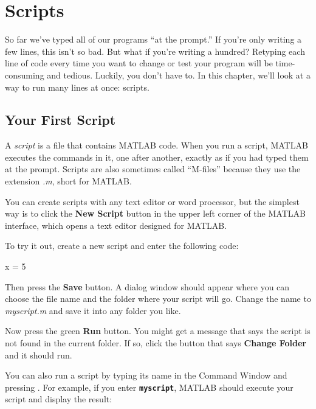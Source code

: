 \chapter{Scripts}

So far we've typed all of our programs ``at the prompt.'' If you're only writing a few lines, this isn't so bad. But what if you're writing a hundred? Retyping each line of code every time you want to change or test your program will be time-consuming and tedious. Luckily, you don't have to. In this chapter, we'll look at a way to run many lines at once: scripts.


\section{Your First Script}

A \emph{script} is a file that contains MATLAB code. When you run a script, MATLAB executes the commands in it, one after another, exactly as if you had typed them at the prompt. Scripts are
also sometimes called ``M-files'' because they use the extension {\em .m}, short for MATLAB. 


You can create scripts with any text editor or word processor, but the simplest way is to click the \textbf{New Script} button in the upper left corner of the MATLAB interface, which opens a text editor designed for MATLAB.

To try it out, create a new script and enter the following code:

\begin{code}
x = 5
\end{code}

Then press the {\bf Save} button.  A dialog window should appear where you can choose the file name and the folder where your script will go.  
Change the name to {\em myscript.m} and save it into any folder you like.

Now press the green {\bf Run} button.  You might get a message that says the script is not found in the current folder.  
If so, click the button that says {\bf Change Folder} and it should run.


You can also run a script by typing its name in the Command Window and pressing . For example, if you enter \textbf{\lstinline{myscript}}, MATLAB should execute your script and display the result:

